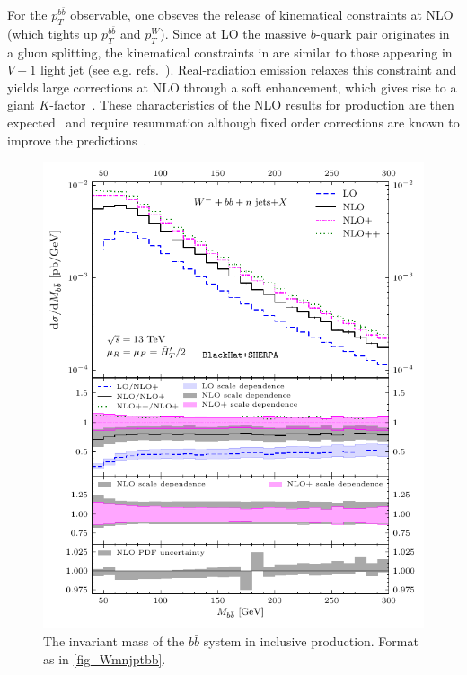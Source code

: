 For the $p_T^{b\bar b}$ observable, one obseves the release of
kinematical constraints at NLO (which tights up $p_T^{b\bar b}$ and $p_T^W$).
Since at LO the massive $b$-quark pair
originates in a gluon splitting, the kinematical constraints in \Wbb{} are
similar to those appearing in $V+1$ light jet (see e.g.
refs.~\cite{BH:W3jPRL,BH:W4j,BH:W5j}). Real-radiation emission relaxes this
constraint and yields large corrections at NLO through a soft enhancement, which
gives rise to a giant $K$-factor~\cite{Rubin:2010xp}. These characteristics of
the NLO results for \Wbb{} production are then expected~\cite{Catani:1997xc} and
require resummation although fixed order corrections are known to improve the
predictions~\cite{Ridder:2015dxa}.


\begin{figure}[ht]
  \centering
  \includegraphics[clip,scale=1]{plots/excl_mbb_v4}
  \caption{The invariant mass of the $b\bar b$ system in inclusive \Wbbm{} production. Format as in \cref{fig_Wmnjptbb}.}
  \label{fig_Wmnjmbb}
\end{figure}

